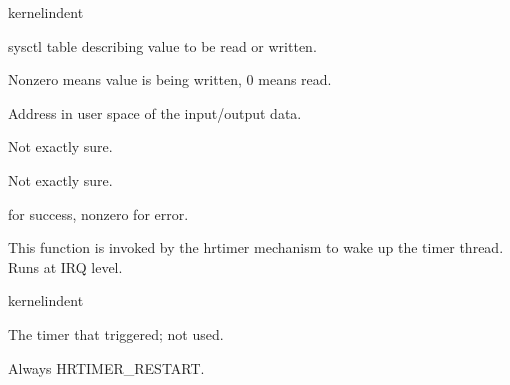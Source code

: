 \documentclass[letterpaper,10pt,english]{sphinxmanual}
\begin{document}
\begin{sphinxuseclass}{kernelindent}
\sphinxAtStartPar
{}
\begin{description}
\sphinxAtStartPar
sysctl table describing value to be read or written.

\sphinxAtStartPar
Nonzero means value is being written, 0 means read.

\sphinxAtStartPar
Address in user space of the input/output data.

\sphinxAtStartPar
Not exactly sure.

\sphinxAtStartPar
Not exactly sure.

\end{description}

\sphinxAtStartPar
{}

 for success, nonzero for error.

\end{sphinxuseclass}

\begin{fulllineitems}
\label{\detokenize{mtpimpl.c:c.MTP_hrtimer}}
\pysigstartsignatures
\pysigstartmultiline
{}
\pysigstopmultiline
\pysigstopsignatures
\sphinxAtStartPar
This function is invoked by the hrtimer mechanism to wake up the timer thread. Runs at IRQ level.

\end{fulllineitems}


\begin{sphinxuseclass}{kernelindent}
\sphinxAtStartPar
{}
\begin{description}
\sphinxAtStartPar
The timer that triggered; not used.

\end{description}

\sphinxAtStartPar
{}

\sphinxAtStartPar
Always HRTIMER\_RESTART.

\end{sphinxuseclass}
\end{document}
